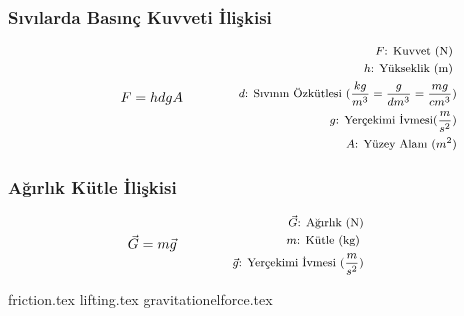\subsubsection*{Sıvılarda Basınç Kuvveti İlişkisi}
\begin{equation}
    F = hdgA \qquad \qquad \parbox{4cm}{\footnotesize$\begin{aligned}
        F\text{: Kuvvet (N) } \\
        h\text{: Yükseklik (m) } \\
        d\text{: Sıvının Özkütlesi } (\frac{kg}{m^3} = \frac{g}{dm^3} = \frac{mg}{cm^3})  \\
        g\text{: Yerçekimi İvmesi} (\frac{m}{s^2}) \\
        A\text{: Yüzey Alanı } (m^2)
\end{aligned}$}
\end{equation}

\subsubsection*{Ağırlık Kütle İlişkisi}
\begin{equation}
    \vec{G} = m\vec{g} \qquad \qquad \parbox{4cm}{\footnotesize$\begin{aligned}
        \vec{G}\text{: Ağırlık (N)} \\
        m\text{: Kütle (kg) } \\
        \vec{g}\text{: Yerçekimi İvmesi } (\frac{m}{s^2})
\end{aligned}$}
\end{equation}

{friction.tex}
{lifting.tex}
{gravitationelforce.tex}
